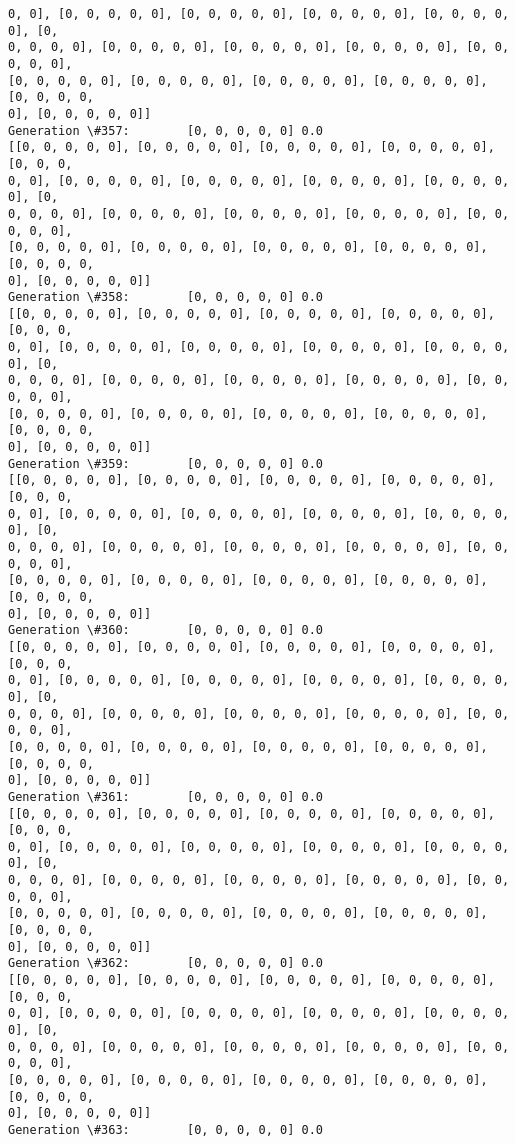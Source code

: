 \documentclass[11pt]{article}
\begin{document}
\begin{Verbatim}[commandchars=\\\{\}]
0, 0], [0, 0, 0, 0, 0], [0, 0, 0, 0, 0], [0, 0, 0, 0, 0], [0, 0, 0, 0, 0], [0,
0, 0, 0, 0], [0, 0, 0, 0, 0], [0, 0, 0, 0, 0], [0, 0, 0, 0, 0], [0, 0, 0, 0, 0],
[0, 0, 0, 0, 0], [0, 0, 0, 0, 0], [0, 0, 0, 0, 0], [0, 0, 0, 0, 0], [0, 0, 0, 0,
0], [0, 0, 0, 0, 0]]
Generation \#357:        [0, 0, 0, 0, 0] 0.0
[[0, 0, 0, 0, 0], [0, 0, 0, 0, 0], [0, 0, 0, 0, 0], [0, 0, 0, 0, 0], [0, 0, 0,
0, 0], [0, 0, 0, 0, 0], [0, 0, 0, 0, 0], [0, 0, 0, 0, 0], [0, 0, 0, 0, 0], [0,
0, 0, 0, 0], [0, 0, 0, 0, 0], [0, 0, 0, 0, 0], [0, 0, 0, 0, 0], [0, 0, 0, 0, 0],
[0, 0, 0, 0, 0], [0, 0, 0, 0, 0], [0, 0, 0, 0, 0], [0, 0, 0, 0, 0], [0, 0, 0, 0,
0], [0, 0, 0, 0, 0]]
Generation \#358:        [0, 0, 0, 0, 0] 0.0
[[0, 0, 0, 0, 0], [0, 0, 0, 0, 0], [0, 0, 0, 0, 0], [0, 0, 0, 0, 0], [0, 0, 0,
0, 0], [0, 0, 0, 0, 0], [0, 0, 0, 0, 0], [0, 0, 0, 0, 0], [0, 0, 0, 0, 0], [0,
0, 0, 0, 0], [0, 0, 0, 0, 0], [0, 0, 0, 0, 0], [0, 0, 0, 0, 0], [0, 0, 0, 0, 0],
[0, 0, 0, 0, 0], [0, 0, 0, 0, 0], [0, 0, 0, 0, 0], [0, 0, 0, 0, 0], [0, 0, 0, 0,
0], [0, 0, 0, 0, 0]]
Generation \#359:        [0, 0, 0, 0, 0] 0.0
[[0, 0, 0, 0, 0], [0, 0, 0, 0, 0], [0, 0, 0, 0, 0], [0, 0, 0, 0, 0], [0, 0, 0,
0, 0], [0, 0, 0, 0, 0], [0, 0, 0, 0, 0], [0, 0, 0, 0, 0], [0, 0, 0, 0, 0], [0,
0, 0, 0, 0], [0, 0, 0, 0, 0], [0, 0, 0, 0, 0], [0, 0, 0, 0, 0], [0, 0, 0, 0, 0],
[0, 0, 0, 0, 0], [0, 0, 0, 0, 0], [0, 0, 0, 0, 0], [0, 0, 0, 0, 0], [0, 0, 0, 0,
0], [0, 0, 0, 0, 0]]
Generation \#360:        [0, 0, 0, 0, 0] 0.0
[[0, 0, 0, 0, 0], [0, 0, 0, 0, 0], [0, 0, 0, 0, 0], [0, 0, 0, 0, 0], [0, 0, 0,
0, 0], [0, 0, 0, 0, 0], [0, 0, 0, 0, 0], [0, 0, 0, 0, 0], [0, 0, 0, 0, 0], [0,
0, 0, 0, 0], [0, 0, 0, 0, 0], [0, 0, 0, 0, 0], [0, 0, 0, 0, 0], [0, 0, 0, 0, 0],
[0, 0, 0, 0, 0], [0, 0, 0, 0, 0], [0, 0, 0, 0, 0], [0, 0, 0, 0, 0], [0, 0, 0, 0,
0], [0, 0, 0, 0, 0]]
Generation \#361:        [0, 0, 0, 0, 0] 0.0
[[0, 0, 0, 0, 0], [0, 0, 0, 0, 0], [0, 0, 0, 0, 0], [0, 0, 0, 0, 0], [0, 0, 0,
0, 0], [0, 0, 0, 0, 0], [0, 0, 0, 0, 0], [0, 0, 0, 0, 0], [0, 0, 0, 0, 0], [0,
0, 0, 0, 0], [0, 0, 0, 0, 0], [0, 0, 0, 0, 0], [0, 0, 0, 0, 0], [0, 0, 0, 0, 0],
[0, 0, 0, 0, 0], [0, 0, 0, 0, 0], [0, 0, 0, 0, 0], [0, 0, 0, 0, 0], [0, 0, 0, 0,
0], [0, 0, 0, 0, 0]]
Generation \#362:        [0, 0, 0, 0, 0] 0.0
[[0, 0, 0, 0, 0], [0, 0, 0, 0, 0], [0, 0, 0, 0, 0], [0, 0, 0, 0, 0], [0, 0, 0,
0, 0], [0, 0, 0, 0, 0], [0, 0, 0, 0, 0], [0, 0, 0, 0, 0], [0, 0, 0, 0, 0], [0,
0, 0, 0, 0], [0, 0, 0, 0, 0], [0, 0, 0, 0, 0], [0, 0, 0, 0, 0], [0, 0, 0, 0, 0],
[0, 0, 0, 0, 0], [0, 0, 0, 0, 0], [0, 0, 0, 0, 0], [0, 0, 0, 0, 0], [0, 0, 0, 0,
0], [0, 0, 0, 0, 0]]
Generation \#363:        [0, 0, 0, 0, 0] 0.0

\end{Verbatim}
\end{document}
